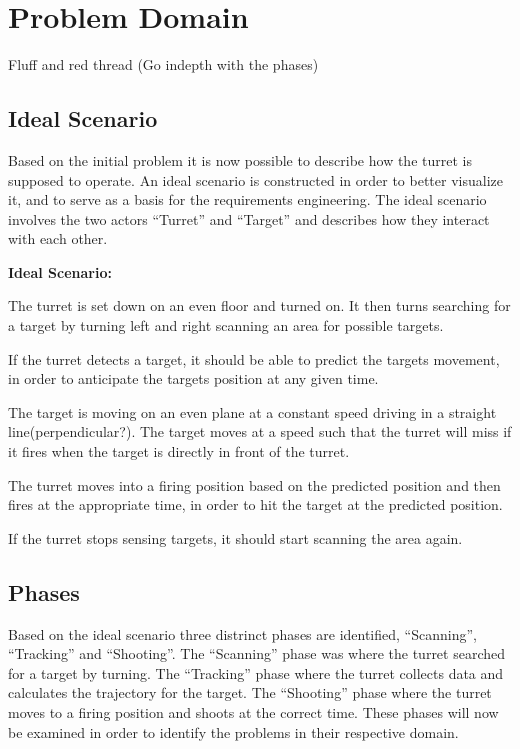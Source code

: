 \chapter{Problem Domain}
Fluff and red thread
(Go indepth with the phases)


\section{Ideal Scenario}
Based on the initial problem it is now possible to describe how the turret is
supposed to operate. An ideal scenario is constructed in order to better
visualize it, and to serve as a basis for the requirements engineering. The
ideal scenario involves the two actors ``Turret'' and ``Target'' and
describes how they interact with each other.

\begin{center}
\colorbox{diff}{
\begin{minipage}{0.8\linewidth}
\textbf{Ideal Scenario:}

The turret is set down on an even floor and turned on. It then turns searching
for a target by turning left and right scanning an area for possible targets.

If the turret detects a target, it should be able to predict the targets
movement, in order to anticipate the targets position at any given time.

The target is moving on an even plane at a constant speed driving in a straight
line(perpendicular?). The target moves at a speed such that the turret will miss
if it fires when the target is directly in front of the turret.

The turret moves into a firing position based on the predicted position and
then fires at the appropriate time, in order to hit the target at the predicted
position. 

If the turret stops sensing targets, it should start scanning the area again.

\end{minipage}
}
\end{center}


\section{Phases}
Based on the ideal scenario three distrinct phases are identified,
``Scanning'', ``Tracking'' and ``Shooting''. The ``Scanning'' phase was where
the turret searched for a target by turning. The ``Tracking'' phase where the
turret collects data and calculates the trajectory for the target. The
``Shooting'' phase where the turret moves to a firing position and shoots at the
correct time. These phases will now be examined in order to identify the
problems in their respective domain.


